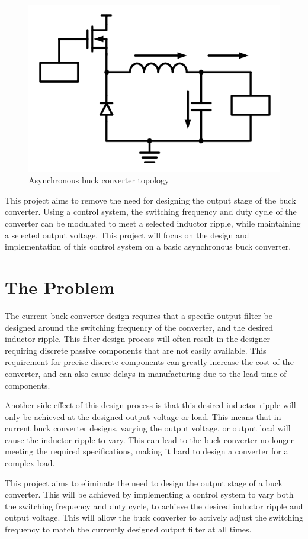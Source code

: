 \documentclass[11pt, a4paper, oneside]{report}
\begin{document}
\begin{figure}[h!]
	\begin{center}
		\includegraphics[width=0.6\linewidth]{asynchronous_buck.png}
		\caption{Asynchronous buck converter topology \cite{BuckTopology}}
		\label{asynchronous_buck}
	\end{center}
\end{figure}

This project aims to remove the need for designing the output stage of the buck converter. Using a control system, the switching frequency and duty cycle of the converter can be modulated to meet a selected inductor ripple, while maintaining a selected output voltage. This project will focus on the design and implementation of this control system on a basic asynchronous buck converter.
\newpage

\section{The Problem}

The current buck converter design requires that a specific output filter be designed around the switching frequency of the converter, and the desired inductor ripple. This filter design process will often result in the designer requiring discrete passive components that are not easily available. This requirement for precise discrete components can greatly increase the cost of the converter, and can also cause delays in manufacturing due to the lead time of components.

Another side effect of this design process is that this desired inductor ripple will only be achieved at the designed output voltage or load. This means that in current buck converter designs, varying the output voltage, or output load will cause the inductor ripple to vary. This can lead to the buck converter no-longer meeting the required specifications, making it hard to design a converter for a complex load.

This project aims to eliminate the need to design the output stage of a buck converter. This will be achieved by implementing a control system to vary both the switching frequency and duty cycle, to achieve the desired inductor ripple and output voltage. This will allow the buck converter to actively adjust the switching frequency to match the currently designed output filter at all times.
\end{document}
